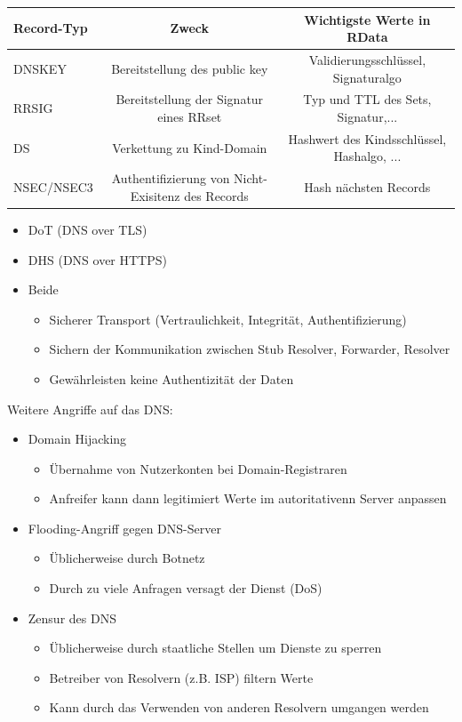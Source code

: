 \documentclass[a4paper,12pt,leqno]{article}
\begin{document}
{\scriptsize
\begin{tabular}{|l|c|c|}
\hline
Record-Typ & Zweck & Wichtigste Werte in RData\\
\hline
DNSKEY & Bereitstellung des public key & Validierungsschlüssel, Signaturalgo\\
RRSIG & Bereitstellung der Signatur eines RRset & Typ und TTL des Sets, Signatur,...\\
DS & Verkettung zu Kind-Domain & Hashwert des Kindsschlüssel, Hashalgo, ...\\
NSEC/NSEC3 & Authentifizierung von Nicht-Exisitenz des Records & Hash nächsten Records\\
\hline
\end{tabular}
}

\begin{itemize}
\item DoT (DNS over TLS)
\item DHS (DNS over HTTPS)
\item Beide
	\begin{itemize}
	\item Sicherer Transport (Vertraulichkeit, Integrität, Authentifizierung)
	\item Sichern der Kommunikation zwischen Stub Resolver, Forwarder, Resolver
	\item Gewährleisten keine Authentizität der Daten
	\end{itemize}

\end{itemize}

Weitere Angriffe auf das DNS:
\begin{itemize}
\item Domain Hijacking
	\begin{itemize}
	\item Übernahme von Nutzerkonten bei Domain-Registraren
	\item Anfreifer kann dann legitimiert Werte im autoritativenn Server anpassen
	\end{itemize}
\item Flooding-Angriff gegen DNS-Server
	\begin{itemize}
	\item Üblicherweise durch Botnetz
	\item Durch zu viele Anfragen versagt der Dienst (DoS)
	\end{itemize}
\item Zensur des DNS
	\begin{itemize}
	\item Üblicherweise durch staatliche Stellen um Dienste zu sperren
	\item Betreiber von Resolvern (z.B. ISP) filtern Werte
	\item Kann durch das Verwenden von anderen Resolvern umgangen werden
	\end{itemize}
\end{itemize}
\end{document}
